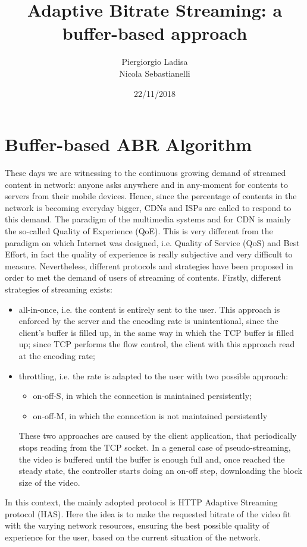 \documentclass[a4paper]{report}
\title{Adaptive Bitrate Streaming: a buffer-based approach }
\author{Piergiorgio Ladisa
\\
Nicola Sebastianelli}
\date{22/11/2018}
\begin{document}
\maketitle
\tableofcontents
\listoffigures
\newpage

\part*{Buffer-based ABR Algorithm}
These days we are witnessing to the continuous growing demand of streamed content in network: anyone asks anywhere and in any-moment for contents to servers from their mobile devices. Hence, since the percentage of contents in the network is becoming everyday bigger, CDNs and ISPs are called to respond to this demand.
The paradigm of the multimedia systems and for CDN is mainly the so-called Quality of Experience (QoE). This is very different from the paradigm on which Internet was designed, i.e. Quality of Service (QoS) and Best Effort, in fact the quality of experience is really subjective and very difficult to measure. Nevertheless, different protocols and strategies have been proposed in order to met the demand of users of streaming of contents. 
Firstly, different strategies of streaming exists:
\begin{itemize}
\item all-in-once, i.e. the content is entirely sent to the user. This approach is enforced by the server and the encoding rate is unintentional, since the client's buffer is filled up, in the same way in which the TCP buffer is filled up; since TCP performs the flow control, the client with this approach read at the encoding rate;
\item throttling, i.e. the rate is adapted to the user with two possible approach:
\begin{itemize}
\item on-off-S, in which the connection is maintained persistently;
\item on-off-M, in which the connection is not maintained persistently
\end{itemize}
These two approaches are caused by the client application, that periodically stops reading from the TCP socket. In a general case of  pseudo-streaming, the video is buffered until the buffer is enough full and, once reached the steady state, the controller starts doing an on-off step, downloading the block size of the video.
\end{itemize}
In this context, the mainly adopted protocol is HTTP Adaptive Streaming protocol (HAS). Here the idea is to make the requested bitrate of the video fit with the varying network resources, ensuring the best possible quality of experience for the user, based on the current situation of the network.
\end{document}
